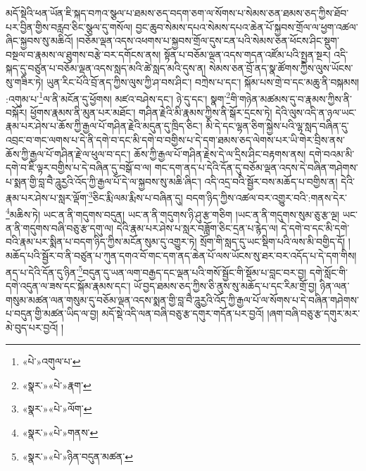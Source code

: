 མདོ་སྡེའི་ཕན་ཡོན་ཇི་སྐད་བཀའ་སྩལ་པ་ཐམས་ཅད་བདག་ཅག་ལ་སོགས་པ་སེམས་ཅན་ཐམས་ཅད་ཀྱིས་ཐོབ་པར་བྱིན་གྱིས་བརླབ་ཅིང་སྩལ་དུ་གསོལ། བྱང་ཆུབ་སེམས་དཔའ་སེམས་དཔའ་ཆེན་པོ་སྐྱབས་གྲོལ་ལ་ཕྱག་འཚལ་ཞིང་སྐྱབས་སུ་མཆིའོ། །བཅོམ་ལྡན་འདས་འཕགས་པ་སྐྱབས་གྲོལ་དུས་ངན་པའི་སེམས་ཅན་ཕོངས་ཤིང་སྡུག་བསྔལ་བ་རྣམས་ལ་ཐུགས་བརྩེ་བར་དགོངས་ནས། སྟོན་པ་བཅོམ་ལྡན་འདས་གདན་འཛོམ་པའི་སྤྱན་སྔར། འདི་སྐད་དུ་བཙུན་པ་བཅོམ་ལྡན་འདས་སླད་མའི་ཚེ་སླད་མའི་དུས་ན། སེམས་ཅན་བྲོ་ནད་སྣ་ཚོགས་ཀྱིས་ལུས་ཡོངས་སུ་གཟིར་ཏེ། ཡུན་རིང་པོའི་བྲོ་ནད་ཀྱིས་ལུས་ཀྱི་ཤ་བས་ཤིང་། བཀྲེས་པ་དང་། སྐོམ་པས་གྲེ་བ་དང་མཆུ་ནི་བསྐམས། :འགུམ་པ་\footnote{«པེ་»འགུལ་པ་}ལ་ནི་མངོན་དུ་ཕྱོགས། མཛའ་བཤེས་དང་། ཉེ་དུ་དང་། སྣག་\footnote{«སྣར་»«པེ་»རྣག་}གི་གཉེན་མཚམས་དུ་བ་རྣམས་ཀྱིས་ནི་བསྐོར། ཕྱོགས་རྣམས་ནི་མུན་པར་མཐོང་། གཤིན་རྗེའི་མི་རྣམས་ཀྱིས་ནི་སྒོར་དྲངས་ཏེ། དེའི་ལུས་འདི་ན་ཉལ་ཡང་རྣམ་པར་ཤེས་པ་ཆོས་ཀྱི་རྒྱལ་པོ་གཤིན་རྗེའི་མདུན་དུ་ཁྲིད་ཅིང་། མི་དེ་དང་ལྷན་ཅིག་སྐྱེས་པའི་ལྷ་སླད་བཞིན་དུ་འབྲང་བ་གང་ལགས་པ་དེ་ནི་དགེ་བ་དང་མི་དགེ་བ་བགྱིས་པ་དེ་དག་ཐམས་ཅད་ལེགས་པར་ཡི་གེར་བྲིས་ནས་ཆོས་ཀྱི་རྒྱལ་པོ་གཤིན་རྗེ་ལ་ཕུལ་བ་དང་། ཆོས་ཀྱི་རྒྱལ་པོ་གཤིན་རྗེས་དེ་ལ་དྲིས་ཤིང་བརྟགས་ནས། དགེ་བའམ་མི་དགེ་བ་ཇི་ལྟར་བགྱིས་པ་དེ་བཞིན་དུ་བསྒོ་བ་ལ། གང་དག་ནད་པ་དེའི་དོན་དུ་བཅོམ་ལྡན་འདས་དེ་བཞིན་གཤེགས་པ་སྨན་གྱི་བླ་བཻ་ཌཱུརྱའི་འོད་ཀྱི་རྒྱལ་པོ་དེ་ལ་སྐྱབས་སུ་མཆི་ཞིང་། འདི་འདྲ་བའི་སྦྱོར་བས་མཆོད་པ་བགྱིས་ན། དེའི་རྣམ་པར་ཤེས་པ་སླར་ལྡོག་\footnote{«སྣར་»«པེ་»ལོག་}ཅིང་རྨི་ལམ་རྨིས་པ་བཞིན་དུ། བདག་ཉིད་ཀྱིས་འཚལ་བར་འགྱུར་བའི་:གནས་དེར་\footnote{«སྣར་»«པེ་»གནས་}མཆིས་ཏེ། ཡང་ན་ནི་གདུགས་བདུན། ཡང་ན་ནི་གདུགས་ཉི་ཤུ་རྩ་གཅིག །ཡང་ན་ནི་གདུགས་སུམ་ཅུ་རྩ་ལྔ། ཡང་ན་ནི་གདུགས་བཞི་བཅུ་རྩ་དགུ་ལ། དེའི་རྣམ་པར་ཤེས་པ་སླར་བཟློག་ཅིང་དྲན་པ་རྙེད་ལ། དེ་དགེ་བ་དང་མི་དགེ་བའི་རྣམ་པར་སྨིན་པ་བདག་ཉིད་ཀྱིས་མངོན་སུམ་དུ་འགྱུར་ཏེ། སྲོག་གི་སླད་དུ་ཡང་སྡིག་པའི་ལས་མི་བགྱིད་དོ། །མཆོད་པའི་སྦྱོར་བ་ནི་བཙུན་པ་ཀུན་དགའ་བོ་གང་དག་ནད་ཆེན་པོ་ལས་ཡོངས་སུ་ཐར་བར་འདོད་པ་དེ་དག་གིས། ནད་པ་དེའི་དོན་དུ་ཉིན་\footnote{«སྣར་»«པེ་»ཉིན་བདུན་མཚན་}བདུན་དུ་ཡན་ལག་བརྒྱད་དང་ལྡན་པའི་གསོ་སྦྱོང་གི་སྡོམ་པ་བླང་བར་བྱ། དགེ་སློང་གི་དགེ་འདུན་ལ་ཟས་དང་སྐོམ་རྣམས་དང་། ཡོ་བྱད་ཐམས་ཅད་ཀྱིས་ཅི་ནུས་སུ་མཆོད་པ་དང་རིམ་གྲོ་བྱ། ཉིན་ལན་གསུམ་མཚན་ལན་གསུམ་དུ་བཅོམ་ལྡན་འདས་སྨན་གྱི་བླ་བཻ་ཌཱུརྱའི་འོད་ཀྱི་རྒྱལ་པོ་ལ་སོགས་པ་དེ་བཞིན་གཤེགས་པ་བདུན་གྱི་མཚན་ཡིད་ལ་བྱ། མདོ་སྡེ་འདི་ལན་བཞི་བཅུ་རྩ་དགུར་གདོན་པར་བྱའོ། །ཞག་བཞི་བཅུ་རྩ་དགུར་མར་མེ་བུད་པར་བྱའོ། །

